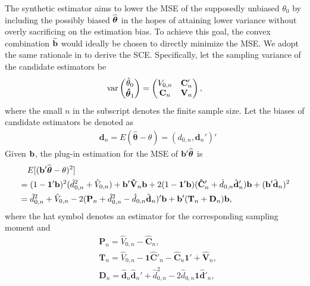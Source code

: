 \documentclass{article}
\begin{document}
The synthetic estimator aims to lower the MSE of the supposedly unbiased $\theta_0$ by including the possibly biased ${\widehat{\boldsymbol{\theta}}}$ in the hopes of attaining lower variance without overly sacrificing on the estimation bias.  To achieve this goal, the convex combination ${\widetilde {{\bf b}}}$ would ideally be chosen to directly minimize the MSE.  We adopt the same rationale in \citep{robinson1991blup, longford2006missing} to derive the SCE. Specifically, 
let the sampling variance of the candidate estimators be
\begin{equation}
\mbox{var} \begin{pmatrix} \hat\theta_0 \\ \boldsymbol {\hat\theta}_1  \end{pmatrix} =
\begin{pmatrix}     V_{0,n} & \mathbf C'_n\\
                             \mathbf C_n     & \mathbf V_n \end{pmatrix},
\end{equation}
where the small $n$ in the subscript denotes the finite sample size. 
Let the biases of candidate estimators be denoted as
\begin{equation}\begin{split}
    &\mathbf d_n = E(\boldsymbol {\hat\theta} - \theta) = (d_{0,n}, \mathbf d_n')'
\end{split}\end{equation}
Given ${\bf b}$, the plug-in estimation for the MSE of ${\bf b}'{\widehat{\boldsymbol{\theta}}}$ is
\begin{equation}\begin{split}\label{bMSE}
 &\quad E[( {\bf b}'{\widehat{\boldsymbol{\theta}}} - \theta)^2]  \\
	&= (1 - \mathbf 1' \mathbf b)^2  (\hat d_{0,n}^2+ \hat V_{0,n}) + \mathbf {b' \hat V}_n \mathbf b  + 2 (1-\mathbf{1'b} )(\mathbf{\hat C}'_n + \hat d_{0,n}\hat{\mathbf d}'_n ) \mathbf{b} + (\mathbf{b'}\hat{\mathbf{d}}_n)^2  \\
    &= \hat d_{0,n}^2 + \hat V_{0, n} - 2(\mathbf P_n + \hat d_{0,n}^2-\hat d_{0,n}\hat{\mathbf d}_n)' \mathbf b + \mathbf b'(\mathbf T_n + \mathbf D_n )\mathbf b,
\end{split}\end{equation}
where the hat symbol denotes an estimator for the corresponding sampling moment and 
\begin{displaymath}\begin{split}
&\mathbf P_n =\hat V_{0, n} - {\mathbf{\hat C}}_n, \\
&\mathbf T_n= \hat V_{0,n} - \mathbf{1 \hat C'}_n - \mathbf{\hat C}_n \mathbf{1'} + \mathbf{\hat V}_n, \\
&\mathbf D_n = \hat{\mathbf{d}}_n \hat{\mathbf{d}}_n' +\hat d_{0,n}^2 -2\hat d_{0,n}\mathbf 1\hat{\mathbf d}'_n,
\end{split}\end{displaymath}
\end{document}
